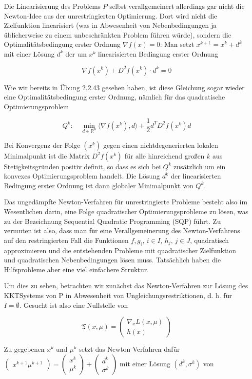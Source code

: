 \documentclass[11pt]{scrreprt}
\theoremstyle{thmstyle}
\numberwithin{thm}{section}
\begin{document}
Die Linearisierung des Problems $P$ selbst verallgemeinert allerdings gar nicht die Newton-Idee aus der unrestringierten Optimierung. Dort wird nicht die Zielfunktion linearisiert (was in Abwesenheit von Nebenbedingungen ja üblicherweise zu einem unbeschränkten Problem führen würde), sondern die Optimalitätsbedingung erster Ordnung $\nabla f(x) = 0$: Man setzt $x^{k+1} = x^k + d^k$ mit einer Lösung $d^k$ der um $x^k$ linearisierten Bedingung erster Ordnung

	$$ \nabla f(x^k) + D^2 f(x^k) \cdot d^k = 0 $$

Wie wir bereits in Übung 2.2.43 gesehen haben, ist diese Gleichung sogar wieder eine Optimalitätsbedingung erster Ordnung, nämlich für das quadratische Optimierungsproblem

	$$ Q^k : \quad \min_{d \in \mathbb{R}^n} \langle \nabla f(x^k), d \rangle + \frac{1}{2} d^T D^2 f(x^k) d $$
	
Bei Konvergenz der Folge $(x^k)$ gegen einen nichtdegenerierten lokalen Minimalpunkt ist die Matrix $D^2 f (x^k)$ für alle hinreichend großen $k$ aus Stetigkeitsgründen positiv definit, so dass es sich bei $Q^k$ zusätzlich um ein konvexes Optimierungsproblem handelt. Die Lösung $d^k$ der linearisierten Bedingung erster Ordnung ist dann globaler Minimalpunkt von $Q^k$. ~\bigskip

Das ungedämpfte Newton-Verfahren für unrestringierte Probleme besteht also im Wesentlichen darin, eine Folge quadratischer Optimierungsprobleme zu lösen, was zu der Bezeichnung Sequential Quadratic Programming (SQP) führt. Zu vermuten ist also, dass man für eine Verallgemeinerung des Newton-Verfahrens auf den restringierten Fall die Funktionen $f, g_i$, $i \in I$, $h_j$, $j \in J$, quadratisch approximieren und die entstehenden Probleme mit quadratischer Zielfunktion und quadratischen Nebenbedingungen lösen muss. Tatsächlich haben die Hilfsprobleme aber eine viel einfachere Struktur. ~\bigskip

Um dies zu sehen, betrachten wir zunächst das Newton-Verfahren zur Lösung des KKTSystems von P in Abwesenheit von Ungleichungsrestriktionen, d. h. für $I = \emptyset$. Gesucht ist also eine Nullstelle von

	$$ \mathfrak{T}(x, \mu) = \begin{pmatrix}
	\nabla_x L(x, \mu) \\ h(x) \end{pmatrix} $$
	
Zu gegebenen $x^k$ und $\mu^k$ setzt das Newton-Verfahren dafür $\begin{pmatrix} x^{k+1} \mu^{k+1} \end{pmatrix} = \begin{pmatrix} x^k \\ \mu^k \end{pmatrix} + \begin{pmatrix} d^k \\ \sigma^k \end{pmatrix}$ mit einer Lösung $(d^k, \sigma^k)$ von
\end{document}
